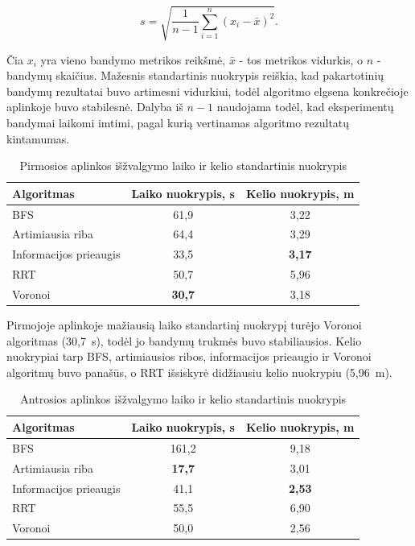 \documentclass[]{VUMIFTemplateClass}
\begin{document}
\begin{equation}
s=\sqrt{\frac{1}{n-1}\sum_{i=1}^{n}(x_i-\bar{x})^2}.
\label{eq:std-dev}
\end{equation}

Čia $x_i$ yra vieno bandymo metrikos reikšmė, $\bar{x}$ - tos metrikos vidurkis, o $n$ - bandymų skaičius. Mažesnis standartinis nuokrypis reiškia, kad
pakartotinių bandymų rezultatai buvo artimesni vidurkiui, todėl algoritmo elgsena konkrečioje aplinkoje buvo stabilesnė. Dalyba iš $n-1$ naudojama todėl, kad
eksperimentų bandymai laikomi imtimi, pagal kurią vertinamas algoritmo rezultatų kintamumas.

\begin{table}[H]
\centering
\caption{Pirmosios aplinkos išžvalgymo laiko ir kelio standartinis nuokrypis}
\label{tab:std-dev-room1}
\small
\setlength{\tabcolsep}{4pt}
\begin{tabular}{|l|c|c|}
\hline
\textbf{Algoritmas} & \textbf{Laiko nuokrypis, s} & \textbf{Kelio nuokrypis, m} \\
\hline
BFS & 61,9 & 3,22 \\
\hline
Artimiausia riba & 64,4 & 3,29 \\
\hline
Informacijos prieaugis & 33,5 & \textbf{3,17} \\
\hline
RRT & 50,7 & 5,96 \\
\hline
Voronoi & \textbf{30,7} & 3,18 \\
\hline
\end{tabular}
\end{table}

Pirmojoje aplinkoje mažiausią laiko standartinį nuokrypį turėjo Voronoi algoritmas (30,7~s), todėl jo bandymų trukmės buvo stabiliausios. Kelio nuokrypiai tarp
BFS, artimiausios ribos, informacijos prieaugio ir Voronoi algoritmų buvo panašūs, o RRT išsiskyrė didžiausiu kelio nuokrypiu (5,96~m).

\begin{table}[H]
\centering
\caption{Antrosios aplinkos išžvalgymo laiko ir kelio standartinis nuokrypis}
\label{tab:std-dev-room2}
\small
\setlength{\tabcolsep}{4pt}
\begin{tabular}{|l|c|c|}
\hline
\textbf{Algoritmas} & \textbf{Laiko nuokrypis, s} & \textbf{Kelio nuokrypis, m} \\
\hline
BFS & 161,2 & 9,18 \\
\hline
Artimiausia riba & \textbf{17,7} & 3,01 \\
\hline
Informacijos prieaugis & 41,1 & \textbf{2,53} \\
\hline
RRT & 55,5 & 6,90 \\
\hline
Voronoi & 50,0 & 2,56 \\
\hline
\end{tabular}
\end{table}
\end{document}
